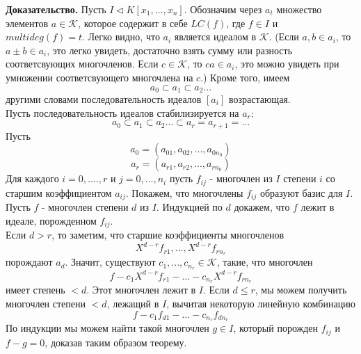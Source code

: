 \textbf{Доказательство.} 
Пусть $I \triangleleft K \left[ x_{1}, ... , x_{n} \right]$. Обозначим через $a_{t}$ множество элементов $a \in \mathcal{K}$, которое содержит в себе $LC(f)$, где $f \in I$ и $ multideg(f) = t $.
Легко видно, что $a_{i}$ является идеалом в $ \mathcal{K} $. (Если $a,b \in a_{i}$, то $ a \pm b \in a_{i}$, это легко увидеть, достаточно взять сумму или разность соответсвующих многочленов. Если $ c \in \mathcal{K}$, то $ca \in a_{i}$, это можно увидеть при умножении соответсвующего многочлена на $c$.)
Кроме того, имеем $$ a_{0} \subset a_{1} \subset a_{2} ... $$
другими словами последовательность идеалов $\left[ a_{i} \right]$ возрастающая. 
\\Пусть последовательность идеалов стабилизируется на $a_{r}$:
$$ a_{0} \subset a_{1} \subset a_{2} ... \subset a_{r} = a_{r+1} = ...$$
Пусть 
$$  a_{0}  = (a_{01}, a_{02}, ..., a_{0n_{0}})$$
$$  a_{r}  = (a_{r1}, a_{r2}, ..., a_{rn_{0}})$$
Для каждого $ i = 0, ...., r$ и $j = 0, ..., n_{i}$ пусть $f_{ij}$ - многочлен из $I$ степени $i$ со старшим коэффициентом $a_{ij}$. Покажем, что многочлены $f_{ij}$ образуют базис для $I$.
\\ Пусть $f$ - многочлен степени $d$ из $I$. Индукцией по $d$ докажем, что $f$ лежит в идеале, порожденном $f_{ij}$.
\\ Если $d > r$, то заметим, что старшие коэффициенты многочленов 
$$ X^{d-r}f_{r1}, ... , X^{d-r}f_{rn_{r}} $$
порождают $a_{d}$. Значит, существуют $ c_{1}, ... , c_{n_{r}} \in  \mathcal{K}$, такие, что многочлен
$$ f - c_{1}X^{d-r}f_{r1} - ... - c_{n_{r}}X^{d-r}f_{rn_{r}} $$
имеет степень $ < d$. Этот многочлен лежит в $I$.
Если $ d \leq r$, мы можем получить многочлен степени $ < d$, лежащий в $I$, вычитая некоторую линейную комбинацию
$$ f - c_{1}f_{d1} - ... - c_{n_{r}}f_{dn_{r}} $$
По индукции мы можем найти такой многочлен $g \in I$, который порожден $f_{ij}$ и $f - g = 0$, доказав таким образом теорему.


